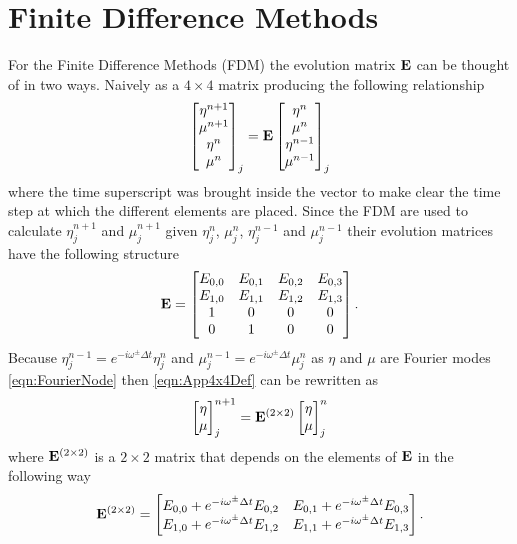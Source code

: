 \section{Finite Difference Methods}
For the Finite Difference Methods (FDM) the evolution matrix $\mathbf{E}$ can be thought of in two ways. Naively as a $4\times4$ matrix producing the following relationship
\begin{equation}
\label{eqn:App4x4Def}
\begin{bmatrix}
{\eta}^{n+1} \\{\mu}^{n+1} \\ {\eta}^{n} \\{\mu}^{n} 
\end{bmatrix}_j = \mathbf{E} \begin{bmatrix}{\eta}^{n} \\{\mu}^{n} \\ {\eta}^{n-1} \\{\mu}^{n-1} 
\end{bmatrix}_j
\end{equation} 
where the time superscript was brought inside the vector to make clear the time step at which the different elements are placed. Since the FDM are used to calculate ${\eta}^{n+1}_j$ and $\mu^{n+1}_j$ given ${\eta}^{n}_j$, $\mu^{n}_j$, ${\eta}^{n-1}_j$ and $\mu^{n-1}_j$ their evolution matrices have the following structure
\begin{equation}
\label{eqn:App4x4}
\mathbf{E} = \begin{bmatrix}E_{0,0} & E_{0,1} & E_{0,2} & E_{0,3}\\
E_{1,0} & E_{1,1} & E_{1,2} & E_{1,3}\\
1 & 0 & 0 & 0\\
0 & 1 & 0 & 0\\
\end{bmatrix}.
\end{equation}
Because ${\eta}^{n-1}_j = e^{-i \omega^\pm \Delta t}{\eta}^{n}_j $ and ${\mu}^{n-1}_j = e^{-i \omega^\pm \Delta t}{\mu}^{n}_j$ as $\eta$ and $\mu$ are Fourier modes \eqref{eqn:FourierNode} then \eqref{eqn:App4x4Def} can be rewritten as
\begin{equation}
\begin{bmatrix}
{\eta} \\{\mu}
\end{bmatrix}^{n+1} _j = \mathbf{E}^{\left(2 \times 2\right)} \begin{bmatrix}{\eta} \\{\mu}
\end{bmatrix}^{n}_j
\end{equation}  
where $\mathbf{E}^{\left(2 \times 2\right)}$ is a $2 \times 2$ matrix that depends on the elements of $\mathbf{E}$ in the following way
\begin{equation}
\label{eqn:App4x4D1}
\mathbf{E}^{\left(2 \times 2\right)} = \begin{bmatrix}E_{0,0} + e^{-i \omega^{\pm }\Delta t} E_{0,2} & E_{0,1} + e^{-i \omega^{\pm }\Delta t} E_{0,3} \\
E_{1,0} + e^{-i \omega^{\pm }\Delta t} E_{1,2} & E_{1,1} + e^{-i \omega^{\pm }\Delta t} E_{1,3} \\
\end{bmatrix}.
\end{equation}

